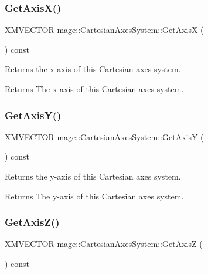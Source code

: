 \subsubsection{\texorpdfstring{Get\+Axis\+X()}{GetAxisX()}}
{\footnotesize\ttfamily X\+M\+V\+E\+C\+T\+OR mage\+::\+Cartesian\+Axes\+System\+::\+Get\+AxisX (\begin{DoxyParamCaption}{ }\end{DoxyParamCaption}) const}

Returns the x-\/axis of this Cartesian axes system.

\begin{DoxyReturn}{Returns}
The x-\/axis of this Cartesian axes system. 
\end{DoxyReturn}
\hypertarget{structmage_1_1_cartesian_axes_system_a1ab9d19fa733ce9667b244cd4a03b8fc}{}\label{structmage_1_1_cartesian_axes_system_a1ab9d19fa733ce9667b244cd4a03b8fc} 
\subsubsection{\texorpdfstring{Get\+Axis\+Y()}{GetAxisY()}}
{\footnotesize\ttfamily X\+M\+V\+E\+C\+T\+OR mage\+::\+Cartesian\+Axes\+System\+::\+Get\+AxisY (\begin{DoxyParamCaption}{ }\end{DoxyParamCaption}) const}

Returns the y-\/axis of this Cartesian axes system.

\begin{DoxyReturn}{Returns}
The y-\/axis of this Cartesian axes system. 
\end{DoxyReturn}
\hypertarget{structmage_1_1_cartesian_axes_system_a143811599a089100b0327e719db44ec5}{}\label{structmage_1_1_cartesian_axes_system_a143811599a089100b0327e719db44ec5} 
\subsubsection{\texorpdfstring{Get\+Axis\+Z()}{GetAxisZ()}}
{\footnotesize\ttfamily X\+M\+V\+E\+C\+T\+OR mage\+::\+Cartesian\+Axes\+System\+::\+Get\+AxisZ (\begin{DoxyParamCaption}{ }\end{DoxyParamCaption}) const}

